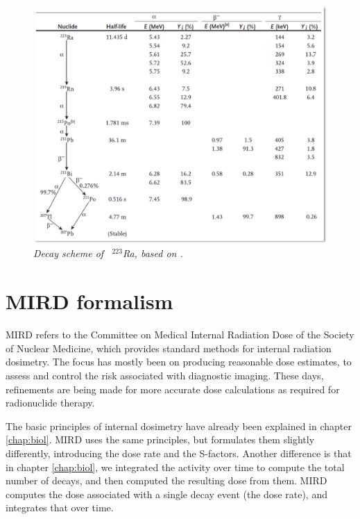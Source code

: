\begin{figure}[htb]
  \includegraphics[width=\textwidth]{figs/fig_223Ra.png}
  \centering
  \caption{\label{fig:223Ra} \emph{Decay scheme of \, $^{223}$Ra,
      based on \cite{Martin2006}.}}
\end{figure}


\section{MIRD formalism}
MIRD refers to the Committee on Medical Internal Radiation Dose of the
Society of Nuclear Medicine, which provides standard methods for
internal radiation dosimetry. The focus has mostly been on producing
reasonable dose estimates, to assess and control the risk associated
with diagnostic imaging. These days, refinements are being made for
more accurate dose calculations as required for radionuclide therapy.

The basic principles of internal dosimetry have already been explained
in chapter \ref{chap:biol}. MIRD uses the same principles, but
formulates them slightly differently, introducing the dose rate and
the S-factors. Another difference is that in chapter \ref{chap:biol},
we integrated the activity over time to compute the total number of
decays, and then computed the resulting dose from them. MIRD computes
the dose associated with a single decay event (the dose rate), and
integrates that over time.

